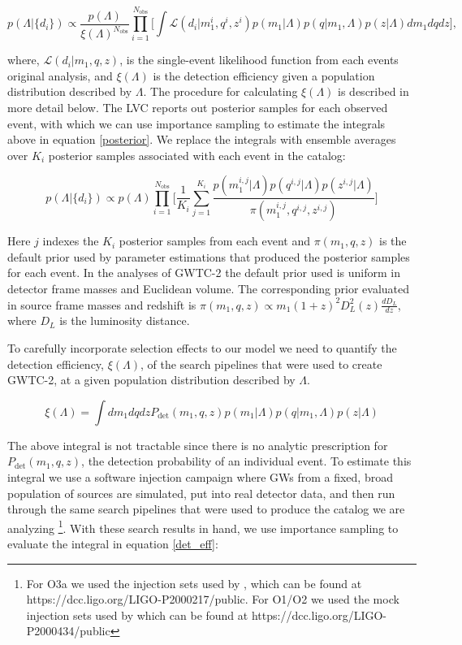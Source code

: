 \documentclass[twocolumn, linenumber]{aastex63}
\begin{document}
\begin{equation} \label{posterior}
    p\left(\Lambda | \{d_i\} \right) \propto \frac{p(\Lambda)}{\xi(\Lambda)^{N_\mathrm{obs}}} \prod_{i=1}^{N_\mathrm{obs}} \Bigg[ \int \mathcal{L}\left(d_i | m_1^i, q^i, z^i \right) p(m_1 | \Lambda) p(q | m_1, \Lambda) p(z | \Lambda) dm_1 dq dz \Bigg],
\end{equation}

\noindent
where, $\mathcal{L}(d_i|m_1, q, z)$, is the single-event likelihood function from each events original analysis, and $\xi(\Lambda)$ is the detection efficiency given a population distribution described by $\Lambda$. The procedure for calculating $\xi(\Lambda)$ is described in more detail below. The LVC reports out posterior samples for each observed event, with which we can use importance sampling to estimate the integrals above in equation \ref{posterior}. We replace the integrals with ensemble averages over $K_i$ posterior samples associated with each event in the catalog:

\begin{equation}
 p\left(\Lambda | \{d_i\}\right) \propto p(\Lambda) \prod_{i=1}^{N_\mathrm{obs}} \bigg[ \frac{1}{K_i} \sum_{j=1}^{K_i} \frac{p(m_1^{i,j}|\Lambda)p(q^{i,j}|\Lambda)p(z^{i,j}|\Lambda)}{\pi(m_1^{i,j}, q^{i,j}, z^{i,j})} \bigg]
\end{equation}

\noindent 
Here $j$ indexes the $K_i$ posterior samples from each event and $\pi(m_1, q, z)$ is the default prior used by parameter estimations that produced the posterior samples for each event. In the analyses of GWTC-2 the default prior used is uniform in detector frame masses and Euclidean volume. The corresponding prior evaluated in source frame masses and redshift is $\pi(m_1, q, z) \propto m_1(1+z)^2 D_L^2(z) \frac{dD_L}{dz}$, where $D_L$ is the luminosity distance. 

To carefully incorporate selection effects to our model we need to quantify the detection efficiency, $\xi(\Lambda)$, of the search pipelines that were used to create GWTC-2, at a given population distribution described by $\Lambda$.
 
\begin{equation} \label{det_eff}
     \xi(\Lambda) = \int dm_1 dq dz P_\mathrm{det}(m_1, q, z)p(m_1 | \Lambda) p(q | m_1, \Lambda) p(z | \Lambda)
\end{equation}
 
\noindent The above integral is not tractable since there is no analytic prescription for $P_\mathrm{det}(m_1,q,z)$, the detection probability of an individual event. To estimate this integral we use a software injection campaign where GWs from a fixed, broad population of sources are simulated, put into real detector data, and then run through the same search pipelines that were used to produce the catalog we are analyzing \footnote{For O3a we used the injection sets used by \citet{o3a_pop}, which can be found at https://dcc.ligo.org/LIGO-P2000217/public. For O1/O2 we used the mock injection sets used by \citet{o1o2_pop} which can be found at https://dcc.ligo.org/LIGO-P2000434/public}. With these search results in hand, we use importance sampling to evaluate the integral in equation \ref{det_eff}:
\end{document}

